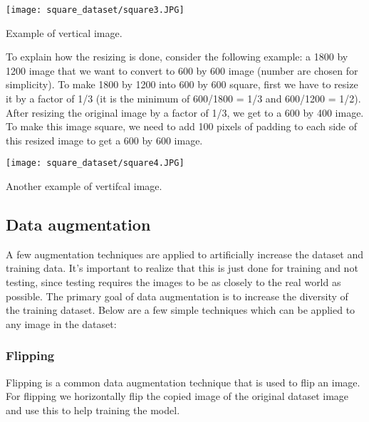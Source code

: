 \begin{marginfigure} %
	\texttt{[image: square\_dataset/square3.JPG]}
	\caption{Example of vertical image.}
\end{marginfigure}

To explain how the resizing is done, consider the following example: a 1800 by 1200 image that we want to convert to 600 by 600 image (number are chosen for simplicity). To make 1800 by 1200 into 600 by 600 square, first we have to resize it by a factor of 1/3 (it is the minimum of 600/1800 = 1/3 and 600/1200 = 1/2). After resizing the original image by a factor of 1/3, we get to a 600 by 400 image. To make this image square, we need to add 100 pixels of padding to each side of this resized image to get a 600 by 600 image.


\begin{marginfigure} %
	\texttt{[image: square\_dataset/square4.JPG]}
	\caption{Another example of vertifcal image.}
\end{marginfigure}


\subsection{Data augmentation}
A few augmentation techniques are applied to artificially increase the dataset and training data. 
It's important to realize that this is just done for training and not testing, 
since testing requires the images to be as closely to the real world as possible. 
The primary goal of data augmentation is to increase the diversity of the training dataset. 
Below are a few simple techniques which can be applied to any image in the dataset:

\subsubsection{Flipping}
Flipping is a common data augmentation technique that is used to flip an image.
For flipping we horizontally flip the copied image of the original dataset image and use this to help training the model. 

